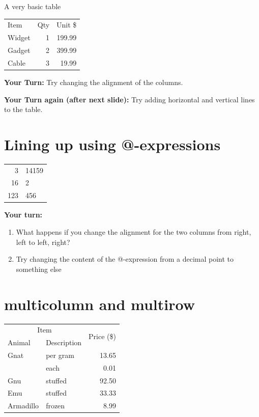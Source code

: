 \documentclass{article}
\begin{document}
A very basic table
\bigskip

\begin{tabular}{lrr}
Item   & Qty & Unit \$ \\
Widget & 1   & 199.99  \\
Gadget & 2   & 399.99  \\
Cable  & 3   & 19.99   \\
\end{tabular}
\bigskip

{\bf Your Turn:}
Try changing the alignment of the columns.

{\bf Your Turn again (after next slide):}
Try adding horizontal and vertical lines to the table.

\clearpage
\section{Lining up using @-expressions}

\begin{tabular}{r@{.}l} \hline
  3   & 14159 \\
  16  & 2     \\
  123 & 456   \\  \hline
\end{tabular}
\bigskip

{\bf Your turn:}
\begin{enumerate}
\item What happens if you change the alignment for the two columns from right, left to left, right? 
\item Try changing the content of the @-expression from a decimal point to something else
\end{enumerate}
\clearpage
 \section{multicolumn  and multirow}


\begin{tabular}{|l|l|r|} \hline
  \multicolumn{2}{|c|}{Item} & \multirow{2}{*}{Price (\$)}\\ \cline{1-2}
  Animal & Description &  \\ \hline
  Gnat  & per gram & 13.65 \\
        & each     &  0.01 \\
  Gnu   & stuffed  & 92.50 \\
  Emu   & stuffed  & 33.33 \\
  Armadillo & frozen & 8.99 \\ \hline
 \end{tabular}
  
\end{document}
